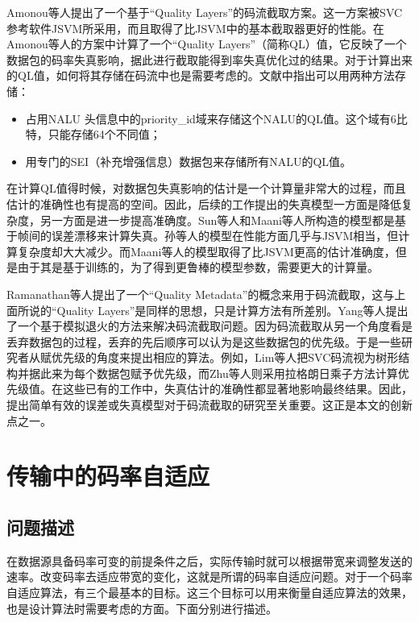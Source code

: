 Amonou等人\supercite{Amonou2007}提出了一个基于“Quality Layers”的码流截取方案。这一方案被SVC参考软件JSVM所采用，而且取得了比JSVM中的基本截取器更好的性能。在Amonou等人的方案中计算了一个“Quality Layers”（简称QL）值，它反映了一个数据包的码率失真影响，据此进行截取能得到率失真优化过的结果。对于计算出来的QL值，如何将其存储在码流中也是需要考虑的。文献中指出可以用两种方法存储：

\begin{itemize}
\item 占用NALU 头信息中的priority\_id域来存储这个NALU的QL值。这个域有6比特，只能存储64个不同值；
\item 用专门的SEI（补充增强信息）数据包来存储所有NALU的QL值。
\end{itemize}

在计算QL值得时候，对数据包失真影响的估计是一个计算量非常大的过程，而且估计的准确性也有提高的空间。因此，后续的工作提出的失真模型一方面是降低复杂度，另一方面是进一步提高准确度。Sun等人\supercite{Sun2009}和Maani等人\supercite{Maani2009}所构造的模型都是基于帧间的误差漂移来计算失真。孙等人的模型在性能方面几乎与JSVM相当，但计算复杂度却大大减少。而Maani等人的模型取得了比JSVM更高的估计准确度，但是由于其是基于训练的，为了得到更鲁棒的模型参数，需要更大的计算量。

Ramanathan等人\supercite{Ramanathan2012}提出了一个“Quality Metadata”的概念来用于码流截取，这与上面所说的“Quality Layers”是同样的思想，只是计算方法有所差别。Yang等人\supercite{Yang2013}提出了一个基于模拟退火的方法来解决码流截取问题。因为码流截取从另一个角度看是丢弃数据包的过程，丢弃的先后顺序可以认为是这些数据包的优先级。于是一些研究者从赋优先级的角度来提出相应的算法。例如，Lim等人\supercite{Lim2006}把SVC码流视为树形结构并据此来为每个数据包赋予优先级，而Zhu等人\supercite{Zhu2011}则采用拉格朗日乘子方法计算优先级值。在这些已有的工作中，失真估计的准确性都显著地影响最终结果。因此，提出简单有效的误差或失真模型对于码流截取的研究至关重要。这正是本文的创新点之一。


\section{传输中的码率自适应}

\subsection{问题描述}

在数据源具备码率可变的前提条件之后，实际传输时就可以根据带宽来调整发送的速率。改变码率去适应带宽的变化，这就是所谓的码率自适应问题。对于一个码率自适应算法，有三个最基本的目标。这三个目标可以用来衡量自适应算法的效果，也是设计算法时需要考虑的方面。下面分别进行描述。

